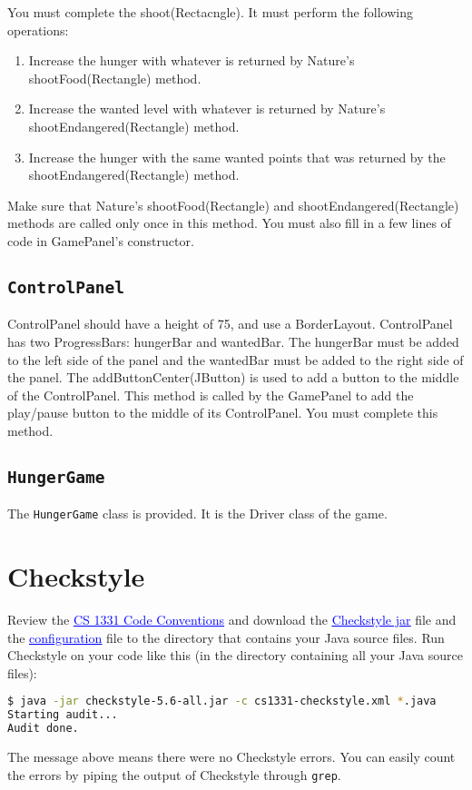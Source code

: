\documentclass[12pt]{article}
\newcommand{\link}[2]{\href{#1}{\textcolor{blue}{\underline{#2}}} }
\newcommand{\codeconventions}{\link{http://www.cc.gatech.edu/~simpkins/teaching/gatech/cs1331/guides/cs1331-code-conventions.html}{CS 1331 Code Conventions}}
\newcommand{\checkstylejar}{\link{http://www.cc.gatech.edu/~simpkins/teaching/gatech/cs1331/guides/checkstyle-5.6-all.jar}{Checkstyle jar}}
\newcommand{\checkstyleconfig}[0]{\link{http://www.cc.gatech.edu/~simpkins/teaching/gatech/cs1331/guides/cs1331-checkstyle.xml}{configuration}}
\begin{document}
You must complete the shoot(Rectacngle).  It must perform the following operations:
\begin{enumerate}
    \item Increase the hunger with whatever is returned by Nature's shootFood(Rectangle) method.
    \item Increase the wanted level with whatever is returned by Nature's shootEndangered(Rectangle) method.
    \item Increase the hunger with the same wanted points that was returned by the shootEndangered(Rectangle) method.
    \end{enumerate}
Make sure that Nature's shootFood(Rectangle) and shootEndangered(Rectangle) methods are called only once in this method.
You must also fill in a few lines of code in GamePanel's constructor.

\subsection{{\tt ControlPanel}}

ControlPanel should have a height of 75, and use a BorderLayout.
ControlPanel has two ProgressBars: hungerBar and wantedBar.
The hungerBar must be added to the left side of the panel and the wantedBar must be added to the right side of the panel.
The addButtonCenter(JButton) is used to add a button to the middle of the ControlPanel.  This method is called by the GamePanel to add the play/pause button to the middle of its ControlPanel.  You must complete this method.

\subsection{{\tt HungerGame}}

The {\tt HungerGame} class is provided.  It is the Driver class of the game.

\newpage


\section{Checkstyle}

Review the \codeconventions and download the \checkstylejar file and the \checkstyleconfig file to the directory that contains your Java source files.  Run Checkstyle on your code like this (in the directory containing all your Java source files):

\begin{lstlisting}[language=bash]
$ java -jar checkstyle-5.6-all.jar -c cs1331-checkstyle.xml *.java
Starting audit...
Audit done.
\end{lstlisting}
The message above means there were no Checkstyle errors.  You can easily count the errors by piping the output of Checkstyle through {\tt grep}.
\end{document}
